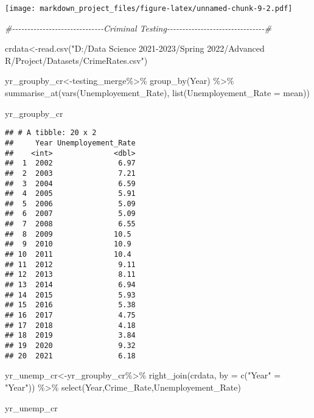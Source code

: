 \documentclass[
]{article}
\newenvironment{Shaded}{\begin{snugshade}}{\end{snugshade}}
\newcommand{\AttributeTok}[1]{\textcolor[rgb]{0.77,0.63,0.00}{#1}}
\newcommand{\CommentTok}[1]{\textcolor[rgb]{0.56,0.35,0.01}{\textit{#1}}}
\newcommand{\FunctionTok}[1]{\textcolor[rgb]{0.00,0.00,0.00}{#1}}
\newcommand{\NormalTok}[1]{#1}
\newcommand{\OtherTok}[1]{\textcolor[rgb]{0.56,0.35,0.01}{#1}}
\newcommand{\SpecialCharTok}[1]{\textcolor[rgb]{0.00,0.00,0.00}{#1}}
\newcommand{\StringTok}[1]{\textcolor[rgb]{0.31,0.60,0.02}{#1}}
\begin{document}
\texttt{[image: markdown\_project\_files/figure-latex/unnamed-chunk-9-2.pdf]}

\begin{Shaded}
\begin{Highlighting}[]
\CommentTok{\#{-}{-}{-}{-}{-}{-}{-}{-}{-}{-}{-}{-}{-}{-}{-}{-}{-}{-}{-}{-}{-}{-}{-}{-}{-}{-}{-}{-}{-}{-}Criminal Testing{-}{-}{-}{-}{-}{-}{-}{-}{-}{-}{-}{-}{-}{-}{-}{-}{-}{-}{-}{-}{-}{-}{-}{-}{-}{-}{-}{-}{-}{-}{-}{-}\#}

\NormalTok{crdata}\OtherTok{\textless{}{-}}\FunctionTok{read.csv}\NormalTok{(}\StringTok{"D:/Data Science 2021{-}2023/Spring 2022/Advanced R/Project/Datasets/CrimeRates.csv"}\NormalTok{)}

\NormalTok{yr\_groupby\_cr}\OtherTok{\textless{}{-}}\NormalTok{testing\_merge}\SpecialCharTok{\%\textgreater{}\%}
  \FunctionTok{group\_by}\NormalTok{(Year) }\SpecialCharTok{\%\textgreater{}\%} 
  \FunctionTok{summarise\_at}\NormalTok{(}\FunctionTok{vars}\NormalTok{(Unemployement\_Rate), }\FunctionTok{list}\NormalTok{(}\AttributeTok{Unemployement\_Rate =}\NormalTok{ mean))}

\NormalTok{yr\_groupby\_cr}
\end{Highlighting}
\end{Shaded}

\begin{verbatim}
## # A tibble: 20 x 2
##     Year Unemployement_Rate
##    <int>              <dbl>
##  1  2002               6.97
##  2  2003               7.21
##  3  2004               6.59
##  4  2005               5.91
##  5  2006               5.09
##  6  2007               5.09
##  7  2008               6.55
##  8  2009              10.5 
##  9  2010              10.9 
## 10  2011              10.4 
## 11  2012               9.11
## 12  2013               8.11
## 13  2014               6.94
## 14  2015               5.93
## 15  2016               5.38
## 16  2017               4.75
## 17  2018               4.18
## 18  2019               3.84
## 19  2020               9.32
## 20  2021               6.18
\end{verbatim}

\begin{Shaded}
\begin{Highlighting}[]
\NormalTok{yr\_unemp\_cr}\OtherTok{\textless{}{-}}\NormalTok{yr\_groupby\_cr}\SpecialCharTok{\%\textgreater{}\%}
  \FunctionTok{right\_join}\NormalTok{(crdata, }\AttributeTok{by =} \FunctionTok{c}\NormalTok{(}\StringTok{"Year"} \OtherTok{=} \StringTok{"Year"}\NormalTok{)) }\SpecialCharTok{\%\textgreater{}\%} 
  \FunctionTok{select}\NormalTok{(Year,Crime\_Rate,Unemployement\_Rate)}

\NormalTok{yr\_unemp\_cr}
\end{Highlighting}
\end{Shaded}
\end{document}

